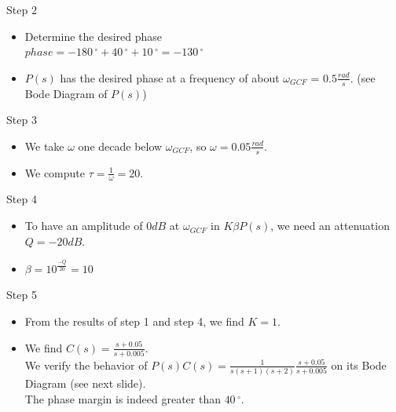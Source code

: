 \begin{frame}
\begin{exampleblock}{Step 2}
	\begin{itemize}

\item Determine the desired phase \\ $phase = -180\,^{\circ} + 40\,^{\circ} + 10\,^{\circ} = -130\,^{\circ}$ \\
\item $P(s)$ has the desired phase at a frequency of about $\omega_{GCF}$ = $0.5 \frac{rad}{s}$. (see Bode Diagram of $P(s)$) \\
	\end{itemize}
\end{exampleblock}
\begin{exampleblock}{Step 3}
	\begin{itemize}
		\item We take $\omega$ one decade below $\omega_{GCF}$, so $\omega = 0.05 \frac{rad}{s}$. 
		\item We compute $\tau = \frac{1}{\omega} = 20$.
	\end{itemize}
\end{exampleblock}
\end{frame}

\begin{frame}
\begin{exampleblock}{Step 4}
\begin{itemize}
\item To have an amplitude of $0 dB$ at $\omega_{GCF}$ in $K\beta P(s)$, we need an attenuation $Q = -20 dB$.
\item $\beta = 10^{\frac{-Q}{20}} = 10$
\end{itemize}
\end{exampleblock}
\begin{exampleblock}{Step 5}
\begin{itemize}
\item From the results of step 1 and step 4, we find $K = 1$.
\item We find $C(s) = \frac{s + 0.05}{s + 0.005}$. \\ We verify the behavior of $P(s)C(s) = \frac{1}{s(s+1)(s+2)}\frac{s + 0.05}{s + 0.005}$ on its Bode Diagram (see next slide). \\
The phase margin is indeed greater than $40\,^{\circ}$.
\end{itemize}
\end{exampleblock}
\end{frame}

